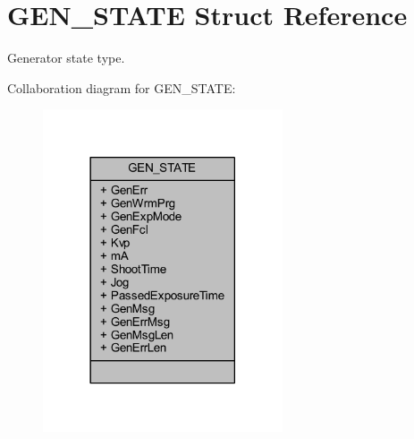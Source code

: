 \hypertarget{struct_g_e_n___s_t_a_t_e}{}\section{G\+E\+N\+\_\+\+S\+T\+A\+TE Struct Reference}
\label{struct_g_e_n___s_t_a_t_e}


Generator state type.  




Collaboration diagram for G\+E\+N\+\_\+\+S\+T\+A\+TE\+:
\nopagebreak
\begin{figure}[H]
\begin{center}
\leavevmode
\includegraphics[width=201pt]{struct_g_e_n___s_t_a_t_e__coll__graph}
\end{center}
\end{figure}
